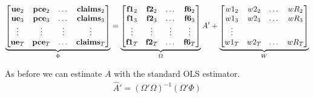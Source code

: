 \documentclass[11pt, letterpaper]{article}\usepackage[]{graphicx}\usepackage[]{color}
\newcommand{\vv}[1]{\textcolor{black}{\mathbf{#1}}}
\begin{document}
\begin{equation}
\underbrace{\begin{bmatrix}
\vv{ue}_{2} & \vv{pce}_{2} & \dots & \vv{claims}_{2}\\
\vv{ue}_{3} & \vv{pce}_{3} & \dots & \vv{claims}_{3}\\
\vdots & \vdots & \vdots & \vdots \\
\vv{ue}_{T} & \vv{pce}_{T} & \dots & \vv{claims}_{T}\\
\end{bmatrix}}_{\Phi}
=
\underbrace{\begin{bmatrix}
\vv{f1}_{2} & \vv{f2}_{2} & \dots & \vv{f6}_{2}\\
\vv{f1}_{3} & \vv{f2}_{3} & \dots & \vv{f6}_{3}\\
\vdots & \vdots & \vdots & \vdots \\
\vv{f1}_{T} & \vv{f2}_{T} & \dots & \vv{f6}_{T}\\
\end{bmatrix}}_{\Omega}
A'
 +
\underbrace{\begin{bmatrix}
w1_2 & w2_2 & \dots & wR_2\\
w1_3 & w2_3 & \dots & wR_3\\
\vdots\\
w1_T & w2_T & \dots & wR_T\\
\end{bmatrix}}_{W}
\end{equation}

As before we can estimate $A$ with the standard OLS estimator.
\begin{align*}
\widehat{A}' = (\Omega' \Omega)^{-1} (\Omega'\Phi)
\end{align*}
\end{document}
